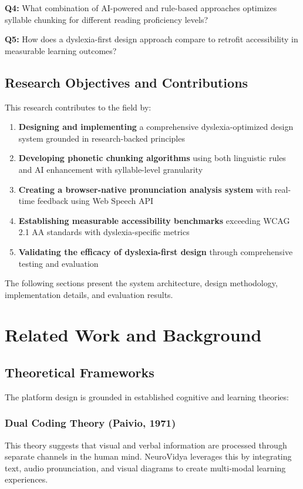 \documentclass[journal]{IEEEtran}
\begin{document}
\textbf{Q4:} What combination of AI-powered and rule-based approaches optimizes syllable chunking for different reading proficiency levels?

\textbf{Q5:} How does a dyslexia-first design approach compare to retrofit accessibility in measurable learning outcomes?

\subsection{Research Objectives and Contributions}

This research contributes to the field by:

\begin{enumerate}
    \item \textbf{Designing and implementing} a comprehensive dyslexia-optimized design system grounded in research-backed principles
    \item \textbf{Developing phonetic chunking algorithms} using both linguistic rules and AI enhancement with syllable-level granularity
    \item \textbf{Creating a browser-native pronunciation analysis system} with real-time feedback using Web Speech API
    \item \textbf{Establishing measurable accessibility benchmarks} exceeding WCAG 2.1 AA standards with dyslexia-specific metrics
    \item \textbf{Validating the efficacy of dyslexia-first design} through comprehensive testing and evaluation
\end{enumerate}

The following sections present the system architecture, design methodology, implementation details, and evaluation results.

\section{Related Work and Background}

\subsection{Theoretical Frameworks}

The platform design is grounded in established cognitive and learning theories:

\subsubsection{Dual Coding Theory (Paivio, 1971)}
This theory suggests that visual and verbal information are processed through separate channels in the human mind. NeuroVidya leverages this by integrating text, audio pronunciation, and visual diagrams to create multi-modal learning experiences.
\end{document}

